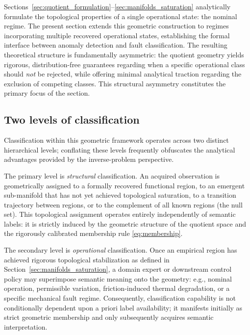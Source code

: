 \documentclass[a4paper]{cas-sc}
\begin{document}
Sections~\ref{sec:quotient_formulation}--\ref{sec:manifolds_saturation} analytically formulate the topological properties of a single operational state: the nominal regime. The present section extends this geometric construction to regimes incorporating multiple recovered operational states, establishing the formal interface between anomaly detection and fault classification. The resulting theoretical structure is fundamentally asymmetric: the quotient geometry yields rigorous, distribution-free guarantees regarding when a specific operational class should \emph{not} be rejected, while offering minimal analytical traction regarding the exclusion of competing classes. This structural asymmetry constitutes the primary focus of the section.

\subsection{Two levels of classification}
\label{subsec:two_levels}

Classification within this geometric framework operates across two distinct hierarchical levels; conflating these levels frequently obfuscates the analytical advantages provided by the inverse-problem perspective.

The primary level is \emph{structural} classification. An acquired observation is geometrically assigned to a formally recovered functional region, to an emergent sub-manifold that has not yet achieved topological saturation, to a transition trajectory between regions, or to the complement of all known regions (the null set). This topological assignment operates entirely independently of semantic labels: it is strictly induced by the geometric structure of the quotient space and the rigorously calibrated membership rule \eqref{eq:membership}.

The secondary level is \emph{operational} classification. Once an empirical region has achieved rigorous topological stabilization as defined in Section~\ref{sec:manifolds_saturation}, a domain expert or downstream control policy may superimpose semantic meaning onto the geometry: e.g., nominal operation, permissible variation, friction-induced thermal degradation, or a specific mechanical fault regime. Consequently, classification capability is not conditionally dependent upon a priori label availability; it manifests initially as strict geometric membership and only subsequently acquires semantic interpretation.
\end{document}
